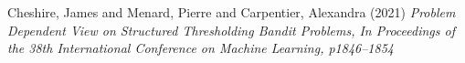 \documentclass[
]{ImperialPoster}
\begin{document}
\begin{multicols}{2}

 

	\begin{thebibliography}{1}
		\small Cheshire, James and Menard, Pierre and Carpentier, Alexandra (2021) \emph{Problem Dependent View on Structured Thresholding Bandit Problems, In Proceedings of the 38th International Conference on Machine Learning, p1846--1854}
		\end{thebibliography}
\end{multicols}





	
	
	
	
	
\end{document}
